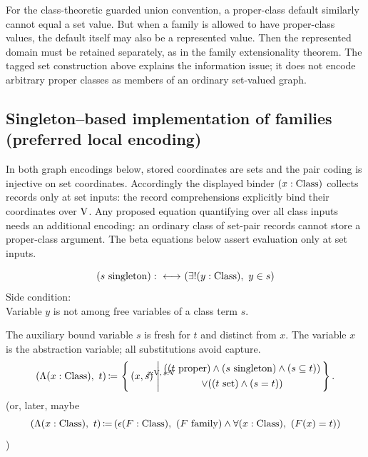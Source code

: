 For the class-theoretic guarded union convention, a proper-class default
similarly cannot equal a set value. But when a family is allowed to have
proper-class values, the default itself may also be a represented value.
Then the represented domain must be retained separately, as in the family
extensionality theorem. The tagged set construction above explains the
information issue; it does not encode arbitrary proper classes as members
of an ordinary set-valued graph.

\subsection{Singleton--based implementation of families (preferred local encoding)}
In both graph encodings below, stored coordinates are sets and the pair
coding is injective on set coordinates. Accordingly the displayed binder
$(x:{\text{Class}})$ collects records only at set inputs: the record
comprehensions explicitly bind their coordinates over $\mathrm{V}$. Any proposed equation
quantifying over all class inputs needs an additional encoding: an
ordinary class of set-pair records cannot store a proper-class argument.
The beta equations below assert evaluation only at set inputs.

\begin{definition}[singleton]
\[
(s\ \text{singleton}) :{\ \longleftrightarrow\ } (\exists!(y:{\text{Class}}),\ y\in s)
\]
Side condition:\\
Variable $y$ is not among free variables of a class term $s$.
\end{definition}
\begin{definition}
The auxiliary bound variable $s$ is fresh for $t$ and distinct from $x$.
The variable $x$ is the abstraction variable; all substitutions avoid capture.
\[
(\Lambda (x:\Class),\ t) \ceq
\ccc{x:\V,\,s:\V}{(x,s)}{\begin{gathered}
((t\proper)\land(s\singleton)\land(s\subclass t))\\
\lor((t\set)\land(s=t))
\end{gathered}}.
\]
(or, later, maybe
\[
(\Lambda (x:{\text{Class}}),\ t) \,{\coloneqq}\, (\epsilon (F:{\text{Class}}),\ (F\mathrm{\ family})\land\forall(x:{\text{Class}}),\ (F(x)=t))
\]
)
\end{definition}

